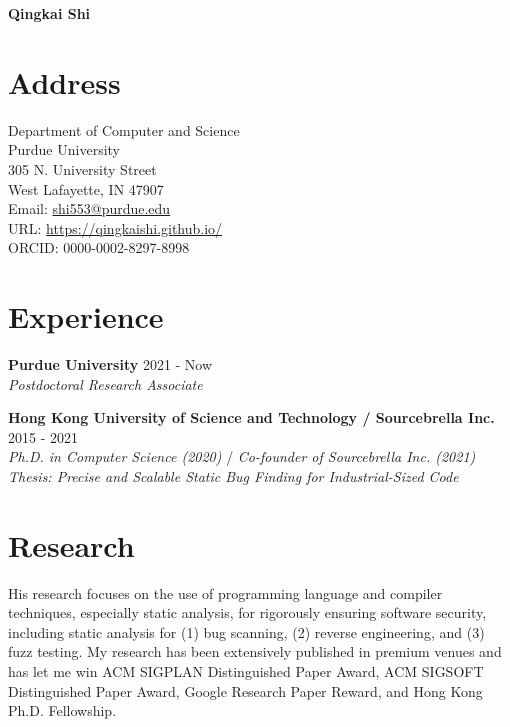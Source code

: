 \documentclass[a4paper,11pt]{article}
\begin{document}
{\hspace*{-\marginparsep minus \marginparwidth}%
\begin{minipage}[t]{\textwidth+\marginparwidth+\marginparsep}%
\centering
{\Large \bfseries {Qingkai Shi}}
\end{minipage}}

\vspace{0.2cm}

\section{Address}

Department of Computer and Science\\
Purdue University\\
305 N. University Street\\
West Lafayette, IN 47907\\
Email: \href{mailto:shi553@purdue.edu}{{shi553@purdue.edu}}\\
URL: \href{https://qingkaishi.github.io/}{https://qingkaishi.github.io/}\\
ORCID: 0000-0002-8297-8998


\section{Experience}

\textbf{Purdue University} \hfill 2021 - Now\\
\textit{Postdoctoral Research Associate}
\vspace{0.3cm}

\textbf{Hong Kong University of Science and Technology / Sourcebrella Inc.} \hfill 2015 - 2021\\
\textit{Ph.D. in Computer Science (2020)} / \textit{Co-founder of Sourcebrella Inc. (2021)} \\
\textit{Thesis: Precise and Scalable Static Bug Finding for Industrial-Sized Code}

\section{Research}

His research focuses on the use of programming language and compiler techniques, especially static analysis, for rigorously ensuring software security, including static analysis for (1) bug scanning, (2) reverse engineering, and (3) fuzz testing.
My research has been extensively published in premium venues and has let me win ACM SIGPLAN Distinguished Paper Award, ACM SIGSOFT Distinguished Paper Award, Google Research Paper Reward, and Hong Kong Ph.D. Fellowship.
\vspace{0.3cm}
\end{document}
